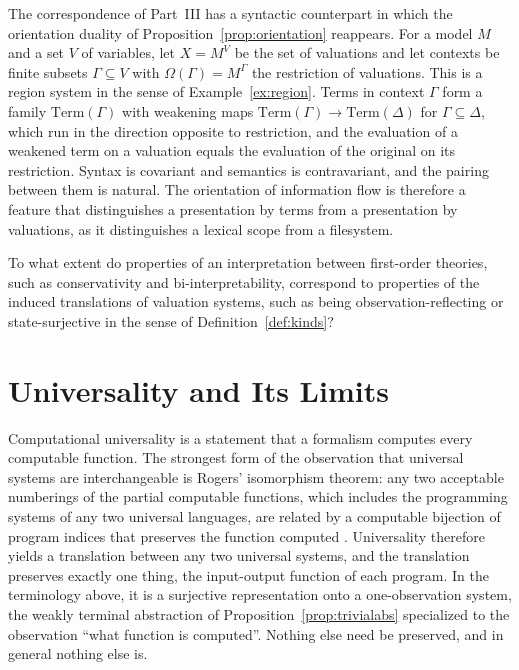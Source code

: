 The correspondence of Part~III has a syntactic counterpart in which the orientation duality of Proposition~\ref{prop:orientation} reappears. For a model $M$ and a set $V$ of variables, let $X=M^V$ be the set of valuations and let contexts be finite subsets $\Gamma\subseteq V$ with $\Omega(\Gamma)=M^{\Gamma}$ the restriction of valuations. This is a region system in the sense of Example~\ref{ex:region}. Terms in context $\Gamma$ form a family $\mathrm{Term}(\Gamma)$ with weakening maps $\mathrm{Term}(\Gamma)\to\mathrm{Term}(\Delta)$ for $\Gamma\subseteq\Delta$, which run in the direction opposite to restriction, and the evaluation of a weakened term on a valuation equals the evaluation of the original on its restriction. Syntax is covariant and semantics is contravariant, and the pairing between them is natural. The orientation of information flow is therefore a feature that distinguishes a presentation by terms from a presentation by valuations, as it distinguishes a lexical scope from a filesystem.

\begin{question}\label{q:interp}
To what extent do properties of an interpretation between first-order theories, such as conservativity and bi-interpretability, correspond to properties of the induced translations of valuation systems, such as being observation-reflecting or state-surjective in the sense of Definition~\ref{def:kinds}?
\end{question}

\section{Universality and Its Limits}

Computational universality is a statement that a formalism computes every computable function. The strongest form of the observation that universal systems are interchangeable is Rogers' isomorphism theorem: any two acceptable numberings of the partial computable functions, which includes the programming systems of any two universal languages, are related by a computable bijection of program indices that preserves the function computed \cite{rogers}. Universality therefore yields a translation between any two universal systems, and the translation preserves exactly one thing, the input-output function of each program. In the terminology above, it is a surjective representation onto a one-observation system, the weakly terminal abstraction of Proposition~\ref{prop:trivialabs} specialized to the observation ``what function is computed''. Nothing else need be preserved, and in general nothing else is.

